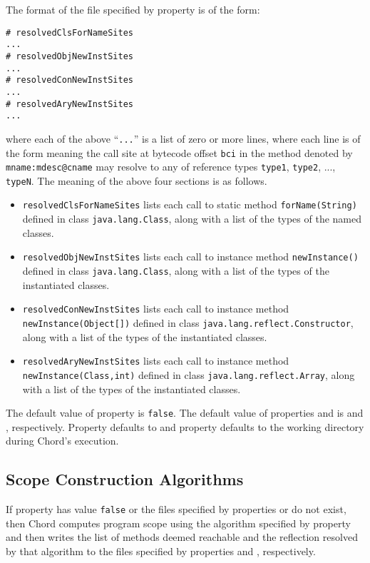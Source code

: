 The format of the file specified by property 
is of the form:
\begin{verbatim}
# resolvedClsForNameSites
...
# resolvedObjNewInstSites
...
# resolvedConNewInstSites
...
# resolvedAryNewInstSites
...
\end{verbatim}
where each of the above ``{\tt ...}'' is a list of zero or more lines, where
each line is of the form
meaning the call site at bytecode offset {\tt bci} in the
method denoted by {\tt mname:mdesc@cname} may resolve to any of
reference types {\tt type1}, {\tt type2}, ..., {\tt typeN}.
The meaning of the above four sections is as follows.
\begin{itemize}
\item {\tt resolvedClsForNameSites} lists
each call to static method {\tt forName(String)} defined in class
{\tt java.lang.Class}, along with a list of the types of the named
classes.
\item {\tt resolvedObjNewInstSites} lists
each call to instance method {\tt newInstance()} defined in class
{\tt java.lang.Class}, along with a list of the types of the
instantiated classes.
\item {\tt resolvedConNewInstSites} lists
each call to instance method {\tt newInstance(Object[])} defined in class
{\tt java.lang.reflect.Constructor}, along with a list of the types of the
instantiated classes.
\item {\tt resolvedAryNewInstSites} lists
each call to instance method {\tt newInstance(Class,int)} defined in class
{\tt java.lang.reflect.Array}, along with a list of the types of the
instantiated classes.
\end{itemize}
The default value of property  is {\tt false}.
The default value of properties  and
 is  and
, respectively.
Property  defaults to
 and property
 defaults to the working directory during Chord's
execution.

\subsection{Scope Construction Algorithms}

If property  has value {\tt false} or the
files specified by properties  or
 do not exist, then Chord computes program
scope using the algorithm specified by property
 and then writes the list of methods deemed
reachable and the reflection resolved by that algorithm to the files
specified by properties  and
, respectively.

